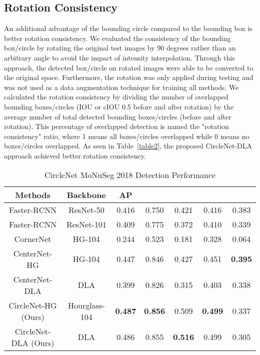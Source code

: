 \documentclass[journal]{IEEEtran}
\newcommand{\Tab}{Table}
\begin{document}
\subsection{Rotation Consistency}
An additional advantage of the bounding circle compared to the bounding box is better rotation consistency. We evaluated the consistency of the bounding box/circle by rotating the original test images by 90 degrees rather than an arbitrary angle to avoid the impact of intensity interpolation. Through this approach, the detected box/circle on rotated images were able to be converted to the original space. Furthermore, the rotation was only applied during testing and was not used as a data augmentation technique for training all methods. We calculated the rotation consistency by dividing the number of overlapped bounding boxes/circles (IOU or cIOU  0.5 before and after rotation) by the average number of total detected bounding boxes/circles (before and after rotation). This percentage of overlapped detection is named the "rotation consistency" ratio, where 1 means all boxes/circles overlapped while 0 means no boxes/circles overlapped. As seen in \Tab~\ref{table2}, the proposed CircleNet-DLA approach achieved better rotation consistency.

\begin{table*}
\caption{CircleNet MoNuSeg 2018 Detection Performance}
\centering
\begin{tabular}{ccccccc}
\hline
Methods & Backbone & AP &  &  &  & \\
 \hline
Faster-RCNN\cite{ren2015faster} & ResNet-50 & 0.416 & 0.750 & 0.421 & 0.416 & 0.383\\
Faster-RCNN\cite{ren2015faster} & ResNet-101 & 0.409 & 0.775 & 0.372 & 0.410 & 0.339\\
CornerNet\cite{law2018cornernet}& HG-104 & 0.244 & 0.523 & 0.181 & 0.328 & 0.064\\
CenterNet-HG\cite{zhou2019objects} &  HG-104 & 0.447 & 0.846 & 0.427 & 0.451 &\textbf{0.395}\\
CenterNet-DLA\cite{zhou2019objects} & DLA & 0.399 & 0.826 & 0.315 & 0.403 & 0.338\\
 \hline
 CircleNet-HG (Ours) & Hourglass-104  & \textbf{0.487} & \textbf{0.856} & 0.509 & \textbf{0.499} & 0.337\\
CircleNet-DLA (Ours) & DLA & 0.486 & 0.855 & \textbf{0.516} & 0.499 & 0.305\\
 \hline
\end{tabular}
\label{table3}
\end{table*}
\end{document}
